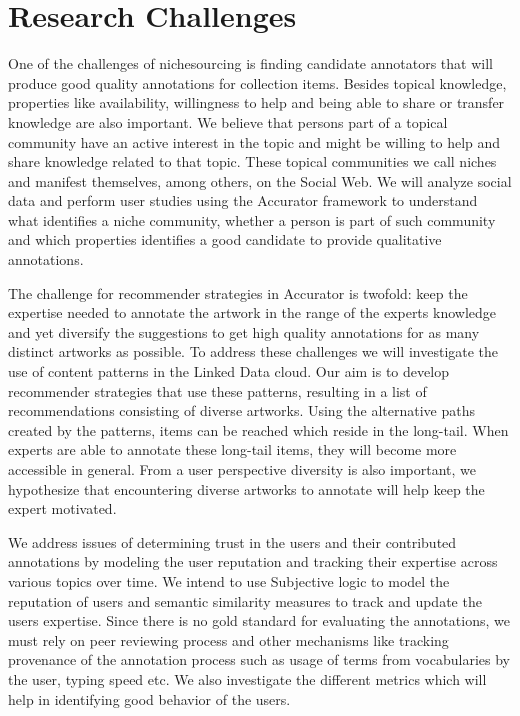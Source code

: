 \section{Research Challenges}
\label{use_case}

One of the challenges of nichesourcing is finding candidate annotators that will produce good quality annotations for collection items. Besides topical knowledge, properties like availability, willingness to help and being able to share or transfer knowledge are also important. We believe that persons part of a topical community have an active interest in the topic and might be willing to help and share knowledge related to that topic. These topical communities we call niches and manifest themselves, among others, on the Social Web. We will analyze social data and perform user studies using the Accurator framework to understand what identifies a niche community, whether a person is part of such community and which properties identifies a good candidate to provide qualitative annotations. 

The challenge for recommender strategies in Accurator is twofold: keep the expertise needed to annotate the artwork in the range of the experts knowledge and yet diversify the suggestions to get high quality annotations for as many distinct artworks as possible. To address these challenges we will investigate the use of content patterns in the Linked Data cloud. Our aim is to develop recommender strategies that use these patterns, resulting in a list of recommendations consisting of diverse artworks. Using the alternative paths created by the patterns, items can be reached which reside in the long-tail. When experts are able to annotate these long-tail items, they will become more accessible in general. From a user perspective diversity is also important, we hypothesize that encountering diverse artworks to annotate will help keep the expert motivated.

We address issues of determining trust in the users and their contributed annotations by modeling the user reputation and tracking their expertise across various topics over time. We intend to use Subjective logic to model the reputation of users and semantic similarity measures to track and update the users expertise. Since there is no gold standard for evaluating the annotations, we must rely on peer reviewing process and other mechanisms like tracking provenance of the annotation process such as usage of terms from vocabularies by the user, typing speed etc. We also investigate the different metrics which will help in identifying good behavior of the users. 

